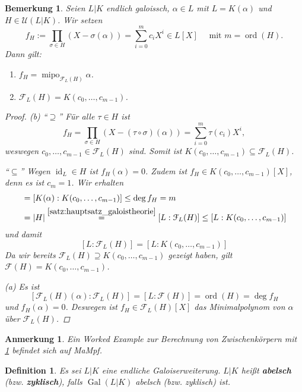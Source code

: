 \documentclass[a4paper, twoside, 11pt, ngerman]{report}
\newcommand{\calF}{\mathcal F}
\newcommand{\calU}{\mathcal U}
\DeclareMathOperator{\Gal}{Gal}
\DeclareMathOperator{\ident}{id}
\DeclareMathOperator{\mipo}{mipo}
\DeclareMathOperator{\ord}{ord}
\theoremstyle{definistyle}
\newtheorem{defini}[satz]{Definition}
\newtheorem{bem}[satz]{Bemerkung}
\newtheorem{anm}[satz]{Anmerkung}
\theoremstyle{remark}
\newcommand{\defn}[1]{\textit{\bfseries #1}}
\begin{document}
\begin{bem}\label{bem:zwischenkoerper_ausrechnen}
Seien $L|K$ endlich galoissch, $\alpha \in L$ mit $L = K(\alpha)$ und $H\in\calU(L|K)$.  
Wir setzen 
\[
f_H := \prod_{\sigma \in H} (X - \sigma(\alpha)) = \sum_{i=0}^m c_i X^i \in L[X] \quad \text{ mit }
m=\ord(H).
\]
Dann gilt:
\begin{enumerate}
\item[(a)] $f_H = \mipo_{\calF_L(H)} \alpha$.
\item[(b)] $\calF_L(H) = K(c_0, \dots, c_{m-1})$.
\end{enumerate}

\begin{proof}
(b) "`$\supseteq$"' Für alle $\tau \in H$ ist
\[
f_H = \prod_{\sigma \in H} (X - (\tau\circ\sigma)(\alpha))=\sum_{i=0}^m\tau(c_i) X^i,
\]
weswegen $c_0, \dots, c_{m-1}\in\calF_L(H)$ sind. Somit ist $K(c_0, \dots, c_{m-1})\subseteq\calF_L(H)$.

"`$\subseteq$"' Wegen $\ident_L\in H$ ist $f_H(\alpha) = 0$. Zudem ist $f_H\in K(c_0,\ldots,c_{m-1})[X]$,
denn es ist $c_m=1$.
Wir erhalten
\begin{align*}
[L : K(c_0, \dots, c_{m-1})]& =[K(\alpha):K(c_0, \dots, c_{m-1})]\leq \deg f_H = m  \\
&= |H| \overset{\ref{satz:hauptsatz_galoistheorie}}{=}[L : \calF_L(H)] \leq [L : K(c_0, \dots, c_{m-1})]
\end{align*}
und damit
\[
[L : \calF_L(H)] = [L : K(c_0, \dots, c_{m-1})]
\]
Da wir bereits $\calF_L(H) \supseteq K(c_0, \dots, c_{m-1})$ gezeigt haben, gilt $\mathcal{F}(H) = K(c_0, \dots, c_{m-1})$.

(a) Es ist
\[
[\calF_L(H)(\alpha):\calF_L(H)]=[L : \mathcal{F}(H)] = \ord(H) = \deg f_H
\]
und $f_H(\alpha) = 0$. Deswegen ist $f_H \in \calF_L(H)[X]$ das Minimalpolynom von $\alpha$ über $\calF_L(H)$.
\end{proof}
\end{bem}

\begin{anm}
Ein Worked Example zur Berechnung von Zwischenkörpern mit \ref{bem:zwischenkoerper_ausrechnen} befindet sich auf MaMpf.
\end{anm}

\begin{defini}\label{def:abelsch_zyklisch}
Es sei $L|K$ eine endliche Galoiserweiterung. $L|K$ heißt \defn{abelsch} (bzw. \defn{zyklisch}), falls $\Gal(L|K)$ abelsch (bzw. zyklisch) ist.
\end{defini}
\end{document}
